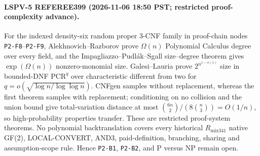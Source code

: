 \paragraph{LSPV-5 REFEREE399 (2026-11-06 18:50 PST; restricted proof-complexity advance).}
For the indexed density-six random proper 3-CNF family in proof-chain nodes
\texttt{P2-F8}--\texttt{P2-F9}, Alekhnovich--Razborov prove
$\Omega(n)$ Polynomial Calculus degree over every field, and the
Impagliazzo--Pudl\'ak--Sgall size--degree theorem gives
$\exp(\Omega(n))$ nonzero-monomial size.  Galesi--Lauria prove
$2^{n^{1-o(1)}}$ size in bounded-DNF $\mathrm{PCR}^{q}$ over
characteristic different from two for
$q=o(\sqrt{\log n/\log\log n})$.  CNFgen samples without replacement,
whereas the first theorem samples with replacement; conditioning on no
collision and the union bound give total-variation distance at most
$\binom{6n}{2}/(8\binom n3)=O(1/n)$, so high-probability properties
transfer.  These are restricted proof-system theorems.  No polynomial
backtranslation covers every historical $R_{\mathrm{mix341}}$ native
GF(2), LOCAL-CONVERT, AND3, paid-definition, branching, sharing and
assumption-scope rule.  Hence \texttt{P2-B1}, \texttt{P2-B2}, and
P versus NP remain open.
